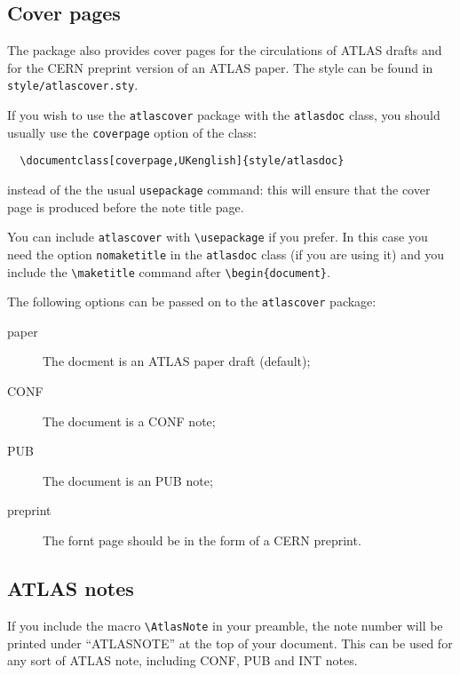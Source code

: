 \documentclass[koma,UKenglish]{style/atlasdoc}
\newcommand{\Macro}[1]{\texttt{\textbackslash #1}\xspace}
\newcommand{\Package}[1]{\texttt{#1}\xspace}
\begin{document}
\subsection{Cover pages}
\label{sec:cover}

The package also provides cover pages for the circulations of ATLAS drafts and 
for the CERN preprint version of an ATLAS paper. The style can be found in \texttt{style/atlascover.sty}.

If you wish to use the \texttt{atlascover} package with the 
\texttt{atlasdoc} class, you should usually use the \texttt{coverpage} option of the class:
\begin{verbatim}
  \documentclass[coverpage,UKenglish]{style/atlasdoc}
\end{verbatim}
instead of the the usual \texttt{usepackage} command: this will ensure
that the cover page is produced before the note title page.

You can include \texttt{atlascover} with \Macro{usepackage} if you prefer.
In this case you need the option \texttt{nomaketitle} in the \texttt{atlasdoc} class
(if you are using it)
and you include the \Macro{maketitle} command after \verb|\begin{document}|.

The following options can be passed on to the \Package{atlascover} package:
\begin{description}
\item[paper] The docment is an ATLAS paper draft (default);
\item[CONF] The document is a CONF note;
\item[PUB] The document is an PUB note;
\item[preprint] The fornt page should be in the form of a CERN preprint.
\end{description}

\subsection{ATLAS notes}
\label{sec:note}

If you include the macro \Macro{AtlasNote} in your preamble,
the note number will be printed under ``ATLASNOTE'' at the top of your document.
This can be used for any sort of ATLAS note, including CONF, PUB and INT notes.
\end{document}
